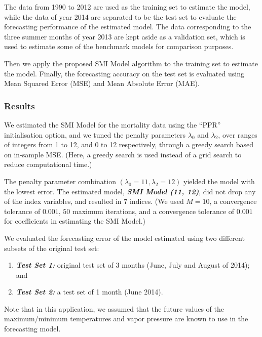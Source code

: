 \documentclass[11pt,a4paper,]{article}
\providecommand{\tightlist}{%
  \setlength{\itemsep}{0pt}\setlength{\parskip}{0pt}}
\begin{document}
The data from 1990 to 2012 are used as the training set to estimate the
model, while the data of year 2014 are separated to be the test set to
evaluate the forecasting performance of the estimated model. The data
corresponding to the three summer months of year 2013 are kept aside as
a validation set, which is used to estimate some of the benchmark models
for comparison purposes.

Then we apply the proposed SMI Model algorithm to the training set to
estimate the model. Finally, the forecasting accuracy on the test set is
evaluated using Mean Squared Error (MSE) and Mean Absolute Error (MAE).

\hypertarget{results}{%
\subsubsection{Results}\label{results}}

We estimated the SMI Model for the mortality data using the ``PPR''
initialisation option, and we tuned the penalty parameters
\(\lambda_{0}\) and \(\lambda_{2}\), over ranges of integers from 1 to
12, and 0 to 12 respectively, through a greedy search based on in-sample
MSE. (Here, a greedy search is used instead of a grid search to reduce
computational time.)

The penalty parameter combination
\((\lambda_{0} = 11, \lambda_{2} = 12)\) yielded the model with the
lowest error. The estimated model, \textbf{\emph{SMI Model (11, 12)}},
did not drop any of the index variables, and resulted in 7 indices. (We
used \(M = 10\), a convergence tolerance of \(0.001\), \(50\) maximum
iterations, and a convergence tolerance of \(0.001\) for coefficients in
estimating the SMI Model.)

We evaluated the forecasting error of the model estimated using two
different subsets of the original test set:

\begin{enumerate}
\def\labelenumi{\arabic{enumi}.}
\tightlist
\item
  \textbf{\emph{Test Set 1:}} original test set of 3 months (June, July
  and August of 2014); and
\item
  \textbf{\emph{Test Set 2:}} a test set of 1 month (June 2014).
\end{enumerate}

Note that in this application, we assumed that the future values of the
maximum/minimum temperatures and vapor pressure are known to use in the
forecasting model.
\end{document}
